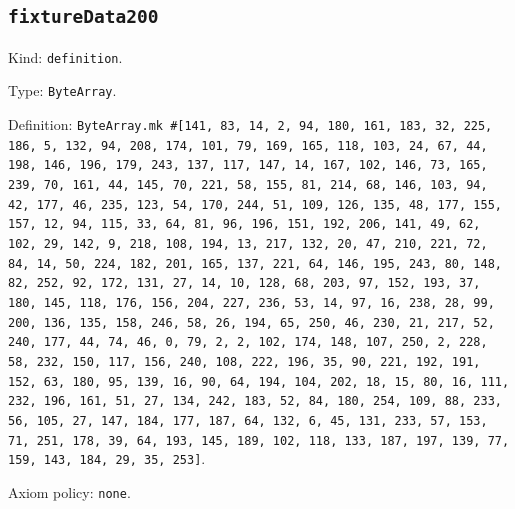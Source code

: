 \documentclass[11pt]{article}
\begin{document}
\subsection*{\texttt{fixtureData200}}
\noindent Kind: \texttt{definition}.\par
\noindent Type: \texttt{ByteArray}.\par
\noindent Definition: \texttt{ByteArray.mk \#[141, 83, 14, 2, 94, 180, 161, 183, 32, 225, 186, 5, 132, 94, 208, 174, 101, 79, 169, 165, 118, 103, 24, 67, 44, 198, 146, 196, 179, 243, 137, 117, 147, 14, 167, 102, 146, 73, 165, 239, 70, 161, 44, 145, 70, 221, 58, 155, 81, 214, 68, 146, 103, 94, 42, 177, 46, 235, 123, 54, 170, 244, 51, 109, 126, 135, 48, 177, 155, 157, 12, 94, 115, 33, 64, 81, 96, 196, 151, 192, 206, 141, 49, 62, 102, 29, 142, 9, 218, 108, 194, 13, 217, 132, 20, 47, 210, 221, 72, 84, 14, 50, 224, 182, 201, 165, 137, 221, 64, 146, 195, 243, 80, 148, 82, 252, 92, 172, 131, 27, 14, 10, 128, 68, 203, 97, 152, 193, 37, 180, 145, 118, 176, 156, 204, 227, 236, 53, 14, 97, 16, 238, 28, 99, 200, 136, 135, 158, 246, 58, 26, 194, 65, 250, 46, 230, 21, 217, 52, 240, 177, 44, 74, 46, 0, 79, 2, 2, 102, 174, 148, 107, 250, 2, 228, 58, 232, 150, 117, 156, 240, 108, 222, 196, 35, 90, 221, 192, 191, 152, 63, 180, 95, 139, 16, 90, 64, 194, 104, 202, 18, 15, 80, 16, 111, 232, 196, 161, 51, 27, 134, 242, 183, 52, 84, 180, 254, 109, 88, 233, 56, 105, 27, 147, 184, 177, 187, 64, 132, 6, 45, 131, 233, 57, 153, 71, 251, 178, 39, 64, 193, 145, 189, 102, 118, 133, 187, 197, 139, 77, 159, 143, 184, 29, 35, 253]}.\par
\noindent Axiom policy: \texttt{none}.\par
\end{document}
